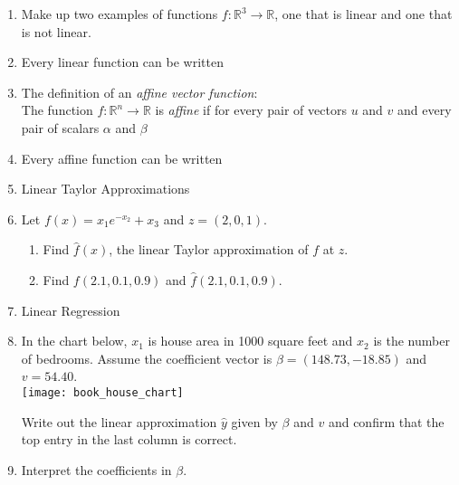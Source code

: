 \documentclass[11pt,fleqn]{article}
\begin{document}
\begin{enumerate}
\vspace{.3in}

\item Make up two examples of functions $f:\mathbb{R}^3 \to \mathbb{R}$, one that is linear and one that is not linear.

\vfill

\item Every linear function can be written

\vspace{1in}

\item The definition of an \emph{affine vector function}:\\
The function $f: \mathbb{R}^n \to \mathbb{R}$ is \emph{affine} if for every pair of vectors $u$ and $v$ and every pair of scalars $\alpha$ and $\beta$ 

\vspace{1in}

\item Every affine function can be written

\vspace{1in}

\newpage
\item Linear Taylor Approximations

\vfill

\item Let $f(x)=x_1e^{-x_2}+x_3$ and $z=(2,0,1).$
	\begin{enumerate}
	\item Find $\widehat{f}(x)$, the linear Taylor approximation of $f$ at $z.$
	\vfill
	\item Find ${f}(2.1,0.1,0.9)$ and $\widehat{f}(2.1,0.1,0.9).$
	\vfill
	\end{enumerate}
\newpage
\item Linear Regression
\vfill
\item In the chart below, $x_1$ is house area in 1000 square feet and $x_2$ is the number of bedrooms. Assume the coefficient  vector is $\beta=(148.73,-18.85)$ and $v=54.40$.\\
\texttt{[image: book\_house\_chart]}

Write out the linear approximation $\widehat{y}$ given by $\beta$ and $v$ and confirm that the top entry in the last column is correct.

\vfill

\item Interpret the coefficients in $\beta$.
\vfill

\end{enumerate}
\end{document}

